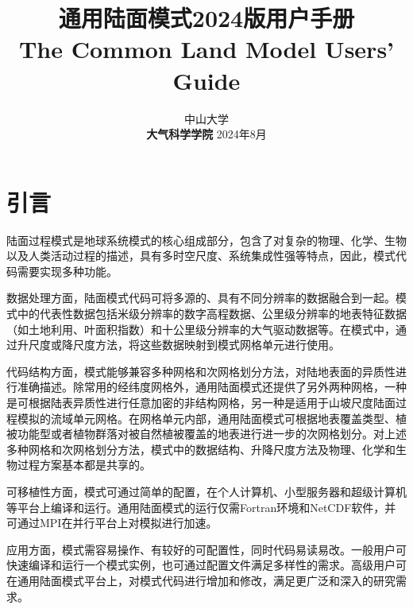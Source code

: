 \documentclass[a4paper,12pt,twoside]{article}
\begin{document}
\title{\huge {\bf 通用陆面模式2024版用户手册}\\
\vspace{6mm}
\fontsize {22}{24}
\bf{ The Common Land Model Users' Guide}
\fontsize {20}{23}
 \vskip 2in
}

\author{
 \large{ 中山大学 }\\[2ex]
 {\bf 大气科学学院}
 \vskip 2in
 \upshape
 \large
 \vskip 0.5in
 2024年8月
}

\normallinespacing
\maketitle

\preface

\clearpage 
\pagestyle{fancy}
\tableofcontents
\clearpage
{}

\section{引言}

陆面过程模式是地球系统模式的核心组成部分，包含了对复杂的物理、化学、生物以及人类活动过程的描述，具有多时空尺度、系统集成性强等特点，因此，模式代码需要实现多种功能。

数据处理方面，陆面模式代码可将多源的、具有不同分辨率的数据融合到一起。模式中的代表性数据包括米级分辨率的数字高程数据、公里级分辨率的地表特征数据（如土地利用、叶面积指数）和十公里级分辨率的大气驱动数据等。在模式中，通过升尺度或降尺度方法，将这些数据映射到模式网格单元进行使用。

代码结构方面，模式能够兼容多种网格和次网格划分方法，对陆地表面的异质性进行准确描述。除常用的经纬度网格外，通用陆面模式还提供了另外两种网格，一种是可根据陆表异质性进行任意加密的非结构网格，另一种是适用于山坡尺度陆面过程模拟的流域单元网格。在网格单元内部，通用陆面模式可根据地表覆盖类型、植被功能型或者植物群落对被自然植被覆盖的地表进行进一步的次网格划分。对上述多种网格和次网格划分方法，模式中的数据结构、升降尺度方法及物理、化学和生物过程方案基本都是共享的。

可移植性方面，模式可通过简单的配置，在个人计算机、小型服务器和超级计算机等平台上编译和运行。通用陆面模式的运行仅需Fortran环境和NetCDF软件，并可通过MPI在并行平台上对模拟进行加速。

应用方面，模式需容易操作、有较好的可配置性，同时代码易读易改。一般用户可快速编译和运行一个模式实例，也可通过配置文件满足多样性的需求。高级用户可在通用陆面模式平台上，对模式代码进行增加和修改，满足更广泛和深入的研究需求。
\end{document}
